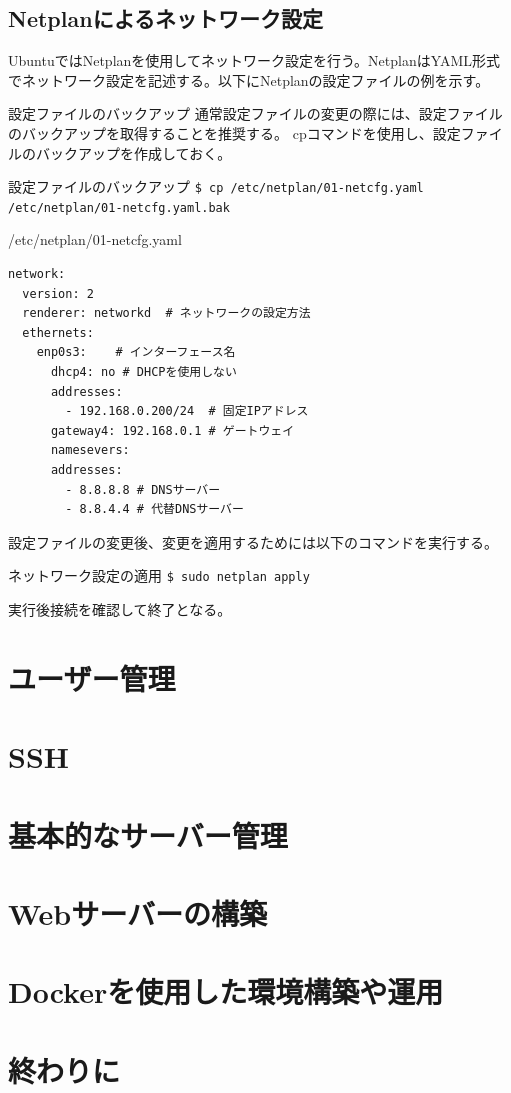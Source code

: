 \documentclass[a4paper, 11pt, dvipdfmx]{jsarticle}
\begin{document}
\subsection{Netplanによるネットワーク設定}
UbuntuではNetplanを使用してネットワーク設定を行う。NetplanはYAML形式でネットワーク設定を記述する。以下にNetplanの設定ファイルの例を示す。
\begin{attentionbox}{設定ファイルのバックアップ}
  通常設定ファイルの変更の際には、設定ファイルのバックアップを取得することを推奨する。
  cpコマンドを使用し、設定ファイルのバックアップを作成しておく。
  \begin{commandbox}{設定ファイルのバックアップ}
    \verb|$ cp /etc/netplan/01-netcfg.yaml /etc/netplan/01-netcfg.yaml.bak|
  \end{commandbox}
\end{attentionbox}
\begin{commandbox}{/etc/netplan/01-netcfg.yaml}
  \begin{verbatim}
network:
  version: 2
  renderer: networkd  # ネットワークの設定方法
  ethernets:
    enp0s3:    # インターフェース名
      dhcp4: no # DHCPを使用しない
      addresses: 
        - 192.168.0.200/24  # 固定IPアドレス
      gateway4: 192.168.0.1 # ゲートウェイ
      namesevers:
      addresses:
        - 8.8.8.8 # DNSサーバー
        - 8.8.4.4 # 代替DNSサーバー
  \end{verbatim}
\end{commandbox}
設定ファイルの変更後、変更を適用するためには以下のコマンドを実行する。
\begin{commandbox}{ネットワーク設定の適用}
  \verb|$ sudo netplan apply|
\end{commandbox}
実行後接続を確認して終了となる。

\section{ユーザー管理}

\section{SSH}

\section{基本的なサーバー管理}

\section{Webサーバーの構築}

\section{Dockerを使用した環境構築や運用}

\section{終わりに}
\end{document}
